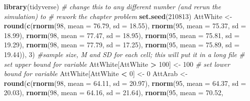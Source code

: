 \documentclass[
  11pt,
]{book}
\newenvironment{Shaded}{\begin{snugshade}}{\end{snugshade}}
\newcommand{\AttributeTok}[1]{\textcolor[rgb]{0.27,0.27,0.27}{#1}}
\newcommand{\CommentTok}[1]{\textcolor[rgb]{0.37,0.37,0.37}{\textit{#1}}}
\newcommand{\DecValTok}[1]{\textcolor[rgb]{0.06,0.06,0.06}{#1}}
\newcommand{\FloatTok}[1]{\textcolor[rgb]{0.06,0.06,0.06}{#1}}
\newcommand{\FunctionTok}[1]{\textcolor[rgb]{0.27,0.27,0.27}{\textbf{#1}}}
\newcommand{\NormalTok}[1]{#1}
\newcommand{\OtherTok}[1]{\textcolor[rgb]{0.37,0.37,0.37}{#1}}
\newcommand{\SpecialCharTok}[1]{\textcolor[rgb]{0.43,0.43,0.43}{\textbf{#1}}}
\begin{document}
\begin{Shaded}
\begin{Highlighting}[]
\FunctionTok{library}\NormalTok{(tidyverse)}
\CommentTok{\# change this to any different number (and rerun the simulation) to}
\CommentTok{\# rework the chapter problem}
\FunctionTok{set.seed}\NormalTok{(}\DecValTok{210813}\NormalTok{)}
\NormalTok{AttWhite }\OtherTok{\textless{}{-}} \FunctionTok{round}\NormalTok{(}\FunctionTok{c}\NormalTok{(}\FunctionTok{rnorm}\NormalTok{(}\DecValTok{98}\NormalTok{, }\AttributeTok{mean =} \FloatTok{76.79}\NormalTok{, }\AttributeTok{sd =} \FloatTok{18.55}\NormalTok{), }\FunctionTok{rnorm}\NormalTok{(}\DecValTok{95}\NormalTok{, }\AttributeTok{mean =} \FloatTok{75.37}\NormalTok{,}
    \AttributeTok{sd =} \FloatTok{18.99}\NormalTok{), }\FunctionTok{rnorm}\NormalTok{(}\DecValTok{98}\NormalTok{, }\AttributeTok{mean =} \FloatTok{77.47}\NormalTok{, }\AttributeTok{sd =} \FloatTok{18.95}\NormalTok{), }\FunctionTok{rnorm}\NormalTok{(}\DecValTok{95}\NormalTok{, }\AttributeTok{mean =} \FloatTok{75.81}\NormalTok{,}
    \AttributeTok{sd =} \FloatTok{19.29}\NormalTok{), }\FunctionTok{rnorm}\NormalTok{(}\DecValTok{98}\NormalTok{, }\AttributeTok{mean =} \FloatTok{77.79}\NormalTok{, }\AttributeTok{sd =} \FloatTok{17.25}\NormalTok{), }\FunctionTok{rnorm}\NormalTok{(}\DecValTok{95}\NormalTok{, }\AttributeTok{mean =} \FloatTok{75.89}\NormalTok{,}
    \AttributeTok{sd =} \FloatTok{19.44}\NormalTok{)), }\DecValTok{3}\NormalTok{)  }\CommentTok{\#sample size, M and SD for each cell; this will put it in a long file}
\CommentTok{\# set upper bound for variable}
\NormalTok{AttWhite[AttWhite }\SpecialCharTok{\textgreater{}} \DecValTok{100}\NormalTok{] }\OtherTok{\textless{}{-}} \DecValTok{100}
\CommentTok{\# set lower bound for variable}
\NormalTok{AttWhite[AttWhite }\SpecialCharTok{\textless{}} \DecValTok{0}\NormalTok{] }\OtherTok{\textless{}{-}} \DecValTok{0}
\NormalTok{AttArab }\OtherTok{\textless{}{-}} \FunctionTok{round}\NormalTok{(}\FunctionTok{c}\NormalTok{(}\FunctionTok{rnorm}\NormalTok{(}\DecValTok{98}\NormalTok{, }\AttributeTok{mean =} \FloatTok{64.11}\NormalTok{, }\AttributeTok{sd =} \FloatTok{20.97}\NormalTok{), }\FunctionTok{rnorm}\NormalTok{(}\DecValTok{95}\NormalTok{, }\AttributeTok{mean =} \FloatTok{64.37}\NormalTok{,}
    \AttributeTok{sd =} \FloatTok{20.03}\NormalTok{), }\FunctionTok{rnorm}\NormalTok{(}\DecValTok{98}\NormalTok{, }\AttributeTok{mean =} \FloatTok{64.16}\NormalTok{, }\AttributeTok{sd =} \FloatTok{21.64}\NormalTok{), }\FunctionTok{rnorm}\NormalTok{(}\DecValTok{95}\NormalTok{, }\AttributeTok{mean =} \FloatTok{70.52}\NormalTok{,}

\end{Highlighting}
\end{Shaded}
\end{document}
